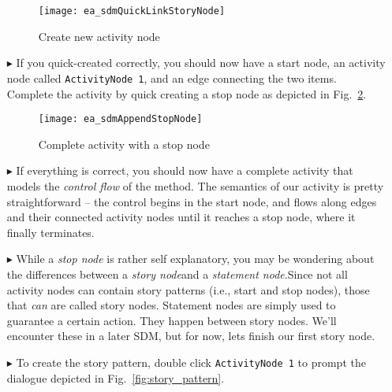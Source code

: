 \begin{itemize}
\begin{figure}[htp]
\begin{center}
  \texttt{[image: ea\_sdmQuickLinkStoryNode]}
  \caption{Create new activity node}  
  \label{fig:sdm_new_activity_node}
\end{center}
\end{figure}

\item[$\blacktriangleright$] If you quick-created correctly, you should now have a start node, an activity node called \texttt{ActivityNode 1}, and an edge
connecting the two items. Complete the activity by quick creating a stop node as depicted in Fig.~\ref{fig:sdm_stop_node}.

\begin{figure}[htp]
\begin{center}
  \texttt{[image: ea\_sdmAppendStopNode]}
  \caption{Complete activity with a stop node}  
  \label{fig:sdm_stop_node}
\end{center}
\end{figure}

\vspace{0.5cm}

\item[$\blacktriangleright$] If everything is correct, you should now have a complete activity that models the \emph{control flow} of the method. 
The semantics of our activity is pretty straightforward -- the control begins in the start node, and flows along edges and their connected activity nodes until
it reaches a stop node, where it finally terminates. 

\vspace{0.5cm}

\item[$\blacktriangleright$] While a \emph{stop node} is rather self explanatory, you may be wondering about the differences between a \emph{story
node}and a \emph{statement node}.Since not all activity nodes can contain story patterns (i.e., start and stop
nodes), those that \emph{can} are called story nodes. Statement nodes are simply used to guarantee a certain action. They happen between story nodes. We'll
encounter these in a later SDM, but for now, lets finish our first story node.

\vspace{0.5cm}

\item[$\blacktriangleright$] To create the story pattern, double click \texttt{ActivityNode 1} to prompt the dialogue depicted in Fig.~\ref{fig:story_pattern}.


\end{itemize}

